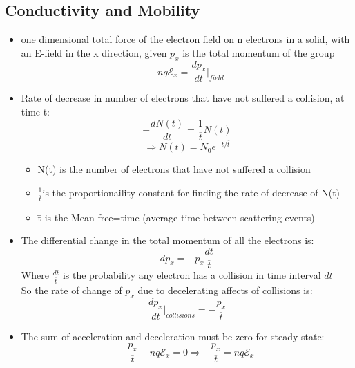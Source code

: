 \documentclass{article}
\begin{document}
\subsection{Conductivity and Mobility}
\begin{itemize}
\item one dimensional total force of the electron field on n electrons in a solid, with an E-field in the x direction, given $p_x$ is the total momentum of the group
  \begin{equation}
    -nq \mathcal{E}_x = \frac{dp_x}{dt}\vert_{field}
  \end{equation}
\item Rate of decrease in number of electrons that have not suffered a collision, at time t:
  \begin{equation}
    -\frac{dN(t)}{dt}=\frac{1}{\overline{t}}N(t)
  \end{equation}
  \begin{equation}
    \Rightarrow N(t)=N_0e^{-t/\overline{t}} 
  \end{equation}
  \begin{itemize}
  \item N(t) is the number of electrons that have not suffered a collision
  \item $\frac{1}{\overline{t}} $is the proportionaility constant for finding the rate of decrease of N(t)
  \item    \={t} is the Mean-free=time (average time between scattering events)
  \end{itemize}
\item The differential change in the total momentum of all the electrons is:
  \begin{equation}
    dp_x = -p_x\frac{dt}{\overline{t}}
  \end{equation}
  Where $\frac{dt}{\overline{t}}$ is the probability any electron has a collision in time interval $dt$\\
  So the rate of change of $p_x$ due to decelerating affects of collisions is:
  \begin{equation}
    \frac{dp_x}{dt}\rvert_{collisions}=-\frac{p_x}{\overline{t}}
  \end{equation}
\item The sum of acceleration and deceleration must be zero for steady state:
  \begin{equation}
    -\frac{p_x}{\overline{t}}-nq\mathcal{E}_x = 0 \Rightarrow -\frac{p_x}{\overline{t}} = nq\mathcal{E}_x
  \end{equation} 

\end{itemize}
\end{document}
